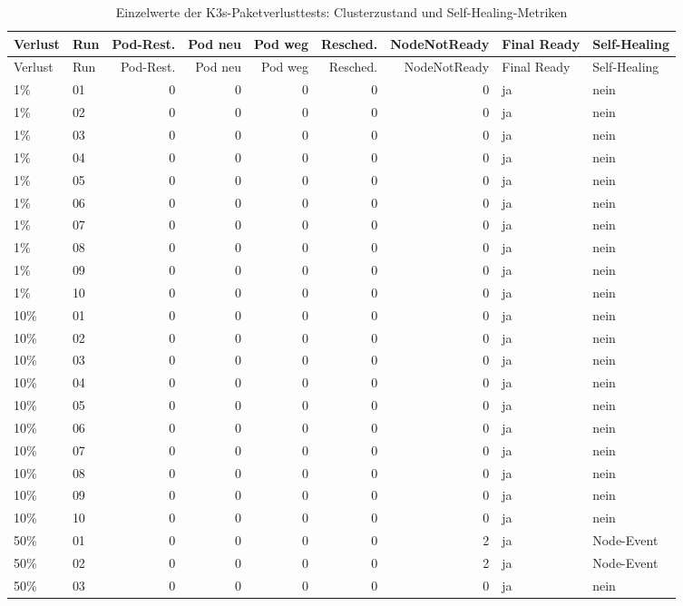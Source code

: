 \begin{longtable}{llrrrrrll}
\caption{Einzelwerte der K3s-Paketverlusttests: Clusterzustand und Self-Healing-Metriken}\label{tab:appendix-k3s-packet-loss-cluster}\\
\toprule
Verlust & Run & Pod-Rest. & Pod neu & Pod weg & Resched. & NodeNotReady & Final Ready & Self-Healing \\
\midrule
\endfirsthead
\toprule
Verlust & Run & Pod-Rest. & Pod neu & Pod weg & Resched. & NodeNotReady & Final Ready & Self-Healing \\
\midrule
\endhead
1\% & 01 & 0 & 0 & 0 & 0 & 0 & ja & nein \\
1\% & 02 & 0 & 0 & 0 & 0 & 0 & ja & nein \\
1\% & 03 & 0 & 0 & 0 & 0 & 0 & ja & nein \\
1\% & 04 & 0 & 0 & 0 & 0 & 0 & ja & nein \\
1\% & 05 & 0 & 0 & 0 & 0 & 0 & ja & nein \\
1\% & 06 & 0 & 0 & 0 & 0 & 0 & ja & nein \\
1\% & 07 & 0 & 0 & 0 & 0 & 0 & ja & nein \\
1\% & 08 & 0 & 0 & 0 & 0 & 0 & ja & nein \\
1\% & 09 & 0 & 0 & 0 & 0 & 0 & ja & nein \\
1\% & 10 & 0 & 0 & 0 & 0 & 0 & ja & nein \\
10\% & 01 & 0 & 0 & 0 & 0 & 0 & ja & nein \\
10\% & 02 & 0 & 0 & 0 & 0 & 0 & ja & nein \\
10\% & 03 & 0 & 0 & 0 & 0 & 0 & ja & nein \\
10\% & 04 & 0 & 0 & 0 & 0 & 0 & ja & nein \\
10\% & 05 & 0 & 0 & 0 & 0 & 0 & ja & nein \\
10\% & 06 & 0 & 0 & 0 & 0 & 0 & ja & nein \\
10\% & 07 & 0 & 0 & 0 & 0 & 0 & ja & nein \\
10\% & 08 & 0 & 0 & 0 & 0 & 0 & ja & nein \\
10\% & 09 & 0 & 0 & 0 & 0 & 0 & ja & nein \\
10\% & 10 & 0 & 0 & 0 & 0 & 0 & ja & nein \\
50\% & 01 & 0 & 0 & 0 & 0 & 2 & ja & Node-Event \\
50\% & 02 & 0 & 0 & 0 & 0 & 2 & ja & Node-Event \\
50\% & 03 & 0 & 0 & 0 & 0 & 0 & ja & nein \\

\end{longtable}
